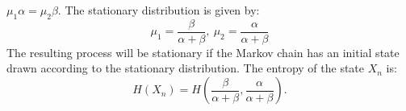 \documentclass[10pt,twocolumn,letterpaper]{article}
\begin{document}
\begin{math}
      \mu_1\alpha = \mu_2\beta.
\end{math} The stationary distribution is given by:
\begin{equation*}
    \mu_1 = \frac{\beta}{\alpha + \beta}, \: \mu_2 = \frac{\alpha}{\alpha + \beta}
\end{equation*} 
The resulting process will be stationary if the Markov chain has an initial state drawn according to the stationary distribution. The entropy of the state \begin{math} X_n
\end{math} is: \\
\begin{equation*}
    H(X_n) = H( \frac{\beta}{\alpha + \beta}, \frac{\alpha}{\alpha + \beta} ).
\end{equation*}\\
\end{document}
